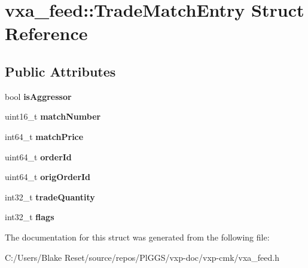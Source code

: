 \hypertarget{structvxa__feed_1_1_trade_match_entry}{}\section{vxa\+\_\+feed\+::Trade\+Match\+Entry Struct Reference}
\label{structvxa__feed_1_1_trade_match_entry}
\subsection*{Public Attributes}
\begin{DoxyCompactItemize}
\item 
\mbox{\label{structvxa__feed_1_1_trade_match_entry_a8f5c19bc241bf0fc18e709184d2b041e}} 
bool {\bfseries is\+Aggressor}
\item 
\mbox{\label{structvxa__feed_1_1_trade_match_entry_a4a844575545d332a9028a881832cc0a4}} 
uint16\+\_\+t {\bfseries match\+Number}
\item 
\mbox{\label{structvxa__feed_1_1_trade_match_entry_a6a7f294418b4e26bd2e5459ce3ce0075}} 
int64\+\_\+t {\bfseries match\+Price}
\item 
\mbox{\label{structvxa__feed_1_1_trade_match_entry_a510008553c9ae99105d9353a4c26ea48}} 
uint64\+\_\+t {\bfseries order\+Id}
\item 
\mbox{\label{structvxa__feed_1_1_trade_match_entry_a4a0000d5d356fb5fbdc7c77f5d4b60df}} 
uint64\+\_\+t {\bfseries orig\+Order\+Id}
\item 
\mbox{\label{structvxa__feed_1_1_trade_match_entry_aefbae53ff61d81341ca45607805032d4}} 
int32\+\_\+t {\bfseries trade\+Quantity}
\item 
\mbox{\label{structvxa__feed_1_1_trade_match_entry_ae3217bdc0e8ea534d8342b97e95d3a49}} 
int32\+\_\+t {\bfseries flags}
\end{DoxyCompactItemize}


The documentation for this struct was generated from the following file\+:\begin{DoxyCompactItemize}
\item 
C\+:/\+Users/\+Blake Reset/source/repos/\+Pl\+G\+G\+S/vxp-\/doc/vxp-\/cmk/vxa\+\_\+feed.\+h\end{DoxyCompactItemize}
